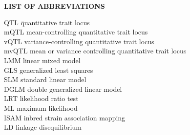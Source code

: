 {}

\begin{center}
{\Large \textbf{LIST OF ABBREVIATIONS}}
\end{center}

\newcommand{\Ab}[2]{\noindent  #1 \> #2 \\}
\newcommand{\Abi}[2]{\noindent #1 \hspace{1.5cm} \= #2 \\}

\begin{tabbing}
\Abi{QTL}{quantitative trait locus}
\Ab{mQTL}{mean-controlling quantitative trait locus}
\Ab{vQTL}{variance-controlling quantitative trait locus}
\Ab{mvQTL}{mean or variance controlling quantitative trait locus}
\Ab{LMM}{linear mixed model}
\Ab{GLS}{generalized least squares}
\Ab{SLM}{standard linear model}
\Ab{DGLM}{double generalized linear model}
\Ab{LRT}{likelihood ratio test}
\Ab{ML}{maximum likelihood}
\Ab{ISAM}{inbred strain association mapping}
\Ab{LD}{linkage disequilibrium}
\end{tabbing}

\clearpage
